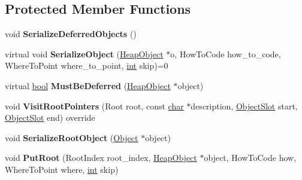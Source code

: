 \subsection*{Protected Member Functions}
\begin{DoxyCompactItemize}
\item 
\mbox{\label{classv8_1_1internal_1_1Serializer_a96ef0df54684240f4839fc03c1e6717c}} 
void {\bfseries Serialize\+Deferred\+Objects} ()
\item 
\mbox{\label{classv8_1_1internal_1_1Serializer_a98c44c473660f94be2ec5e3762e2c547}} 
virtual void {\bfseries Serialize\+Object} (\mbox{\hyperlink{classv8_1_1internal_1_1HeapObject}{Heap\+Object}} $\ast$o, How\+To\+Code how\+\_\+to\+\_\+code, Where\+To\+Point where\+\_\+to\+\_\+point, \mbox{\hyperlink{classint}{int}} skip)=0
\item 
\mbox{\label{classv8_1_1internal_1_1Serializer_a181b6db5c2e7783a59da433d60d378d1}} 
virtual \mbox{\hyperlink{classbool}{bool}} {\bfseries Must\+Be\+Deferred} (\mbox{\hyperlink{classv8_1_1internal_1_1HeapObject}{Heap\+Object}} $\ast$object)
\item 
\mbox{\label{classv8_1_1internal_1_1Serializer_ade8bf661f154e9e6769b0e125064d3d7}} 
void {\bfseries Visit\+Root\+Pointers} (Root root, const \mbox{\hyperlink{classchar}{char}} $\ast$description, \mbox{\hyperlink{classv8_1_1internal_1_1ObjectSlot}{Object\+Slot}} start, \mbox{\hyperlink{classv8_1_1internal_1_1ObjectSlot}{Object\+Slot}} end) override
\item 
\mbox{\label{classv8_1_1internal_1_1Serializer_afc06db54eef4c3c066f161f5ab8e48ee}} 
void {\bfseries Serialize\+Root\+Object} (\mbox{\hyperlink{classv8_1_1internal_1_1Object}{Object}} $\ast$object)
\item 
\mbox{\label{classv8_1_1internal_1_1Serializer_a9bc6f69dfcec21a24efde69fa60d69eb}} 
void {\bfseries Put\+Root} (Root\+Index root\+\_\+index, \mbox{\hyperlink{classv8_1_1internal_1_1HeapObject}{Heap\+Object}} $\ast$object, How\+To\+Code how, Where\+To\+Point where, \mbox{\hyperlink{classint}{int}} skip)
\item 

\end{DoxyCompactItemize}
